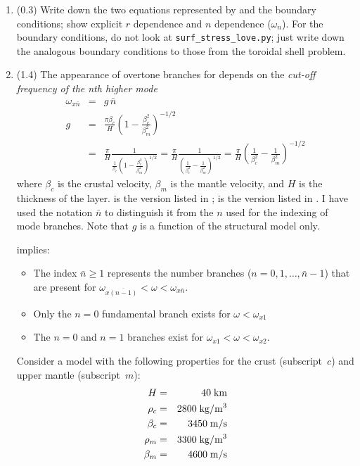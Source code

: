 \documentclass[11pt,titlepage,fleqn]{article}
\newcommand{\cutoff}[1]{{#1}_{x\bar{n}}}
\newcommand{\tfileBB}{{\tt surf\_stress\_love.py}}
\begin{document}
\begin{enumerate}

\item (0.3) Write down the two equations represented by  and the boundary conditions; show explicit $r$ dependence and $n$ dependence (\eg $\omega_n$). For the boundary conditions, do not look at \tfileBB; just write down the analogous boundary conditions to those from the toroidal shell problem.


\item (1.4) The appearance of overtone branches for  depends on the {\em cut-off frequency of the nth higher mode} 
%
\begin{eqnarray}
\cutoff{\omega} &=& g\,\bar{n}
\label{wcn}
\\
g &=& \frac{\pi\beta_c}{H} \left( 1 - \frac{\beta_c^2}{\beta_m^2}\right)^{-1/2}
\label{wcn_Aki}
\\
&=& \frac{\pi}{H} \frac{1}{\frac{1}{\beta_c}\left(1 - \frac{\beta_c^2}{\beta_m^2} \right)^{1/2}}
= \frac{\pi}{H} \frac{1}{\left(\frac{1}{\beta_c^2} - \frac{1}{\beta_m^2} \right)^{1/2}}
= \frac{\pi}{H} \left( \frac{1}{\beta_c^2} - \frac{1}{\beta_m^2} \right)^{-1/2}
\label{wcn_SW}
\end{eqnarray}
%
where $\beta_c$ is the crustal velocity, $\beta_m$ is the mantle velocity, and $H$ is the thickness of the layer.  is the version listed in \citet[][Eq. 7.8]{AkiRichardsE2};  is the version listed in  \citet[][p. 92]{SteinWysession}. I have used the notation $\bar{n}$ to distinguish it from the $n$ used for the indexing of mode branches. Note that $g$ is a function of the structural model only.

 implies:
%
\begin{itemize}
\item The index $\bar{n} \ge 1$ represents the number branches ($n = 0, 1, \ldots, \bar{n}-1$) that are present for $\omega_{x\overline{(n-1)}} < \omega < \omega_{x\bar{n}}$.
\item Only the $n=0$ fundamental branch exists for $\omega < \omega_{x1}$
\item The $n=0$ and $n=1$ branches exist for $\omega_{x1} < \omega < \omega_{x2}$.
\end{itemize}
%

Consider a model with the following properties for the crust (subscript~$c$) and upper mantle (subscript~$m$):
%
\begin{eqnarray*}
H &=& 40\;{\rm km}
\\
\rho_c &=& 2800 \;{\rm kg/m^3}
\\
\beta_c &=& 3450 \;{\rm m/s}
\\
\rho_m &=& 3300 \;{\rm kg/m^3}
\\
\beta_m &=& 4600 \;{\rm m/s}
\end{eqnarray*}


\end{enumerate}
\end{document}
